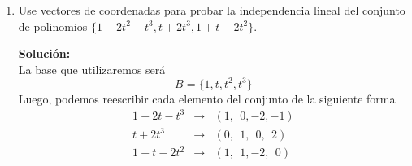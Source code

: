 \documentclass[12pt]{article}
\newenvironment{solucion}
{\begin{mdframed}[backgroundcolor=black!10]
		{\bf Solución:}\\
	}
	{
	\end{mdframed}
}
\newenvironment{preguntas}
{\begin{enumerate}\itemsep12pt
	}
	{
	\end{enumerate}
}
\newcommand{\ra}{\rightarrow}
\begin{document}
\begin{preguntas}
\begin{solucion}
Luego, debemos encontrar $\begin{bmatrix}
a & b \\c & d
\end{bmatrix}$ tal que
$$\begin{bmatrix} 1 & -1 \\ 0 & 0 \end{bmatrix}
\begin{bmatrix}
a & b \\c & d
\end{bmatrix}
= 0$$
$$a-c = 0 \qquad b - d = 0$$
$$a = c \qquad b = d$$
Por lo tanto,
$$X = \begin{bmatrix}
a & b \\
a & b
\end{bmatrix} =
a
\begin{bmatrix}
1 & 0 \\
1 & 0
\end{bmatrix} + 
b
\begin{bmatrix}
0 & 1 \\
0 & 1
\end{bmatrix} =
Gen\left\{
\begin{bmatrix}
1 & 0 \\
1 & 0
\end{bmatrix},
\begin{bmatrix}
0 & 1 \\
0 & 1
\end{bmatrix}
\right\}
$$
Finalmente, una base para $C$ es $\left\{
\begin{bmatrix}
1 & 0 \\
1 & 0
\end{bmatrix},
\begin{bmatrix}
0 & 1 \\
0 & 1
\end{bmatrix}
\right\}$ y su dimensión es 2.
\end{solucion}
\item Use vectores de coordenadas para probar la independencia lineal del conjunto de polinomios $\{1-2t^2-t^3,t+2t^3,1+t-2t^2\}$.
\begin{solucion}
La base que utilizaremos será
		$$B = \{1,t,t^2,t^3\}$$
		Luego, podemos reescribir cada elemento del conjunto de la siguiente forma
		$$\begin{array}{lcl}
		1-2t-t^3 & \ra & (1,\ \ 0,-2,-1)\\
		t+2t^3 & \ra & (0,\ \ 1,\ \ 0,\ \ 2)\\
		1+t-2t^2 & \ra & (1,\ \ 1,-2,\ \ 0)
		\end{array}$$

\end{solucion}
\end{preguntas}
\end{document}
